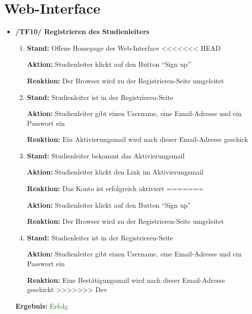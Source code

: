 \documentclass[a4paper]{scrreprt}
\begin{document}
	      \section{Web-Interface}
		      \begin{itemize}
		      		          \item \textbf{/TF10/ Registrieren des Studienleiters}
		      		          \begin{enumerate}
		      		               \item \par \textbf{Stand: }Offene Homepage des Web-Interface
<<<<<<< HEAD
    		      		                \par \textbf{Aktion: }Studienleiter klickt auf den Button ``Sign up''
    		      		                \par \textbf{Reaktion: }Der Browser wird zu der Registrieren-Seite umgeleitet
		      			            \item \par \textbf{Stand: }Studienleiter ist in der Registrieren-Seite
    		      		                \par \textbf{Aktion: }Studienleiter gibt einen Username, eine Email-Adresse und ein Passwort ein
    		      		                \par \textbf{Reaktion: }Ein Aktivierungsmail wird nach dieser Email-Adresse geschick
                                    \item \par \textbf{Stand: }Studienleiter bekommt das Aktivierungsmail
                                        \par \textbf{Aktion: }Studienleiter klickt den Link im Aktivierungsmail
                                        \par \textbf{Reaktion: }Das Konto ist erfolgreich aktiviert
=======
		      		                \par \textbf{Aktion: }Studienleiter klickt auf den Button ``Sign up''
		      		                \par \textbf{Reaktion: }Der Browser wird zu der Registrieren-Seite umgeleitet
		      			            \item \par \textbf{Stand: }Studienleiter ist in der Registrieren-Seite
		      		                \par \textbf{Aktion: }Studienleiter gibt einen Username, eine Email-Adresse und ein Passwort ein
		      		                \par \textbf{Reaktion: }Eine Bestätigungsmail wird nach dieser Email-Adresse geschickt
>>>>>>> Dev
		      		           \end{enumerate}
		      		           \vspace*{0.3cm}
		      		           \par \textbf{Ergebnis: }\textcolor{green}{Erfolg}
		      		           \vspace*{0.6cm}
		      		

\end{itemize}
\end{document}
